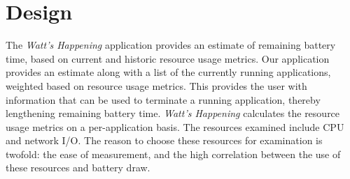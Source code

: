 \section{Design}
\label{sec:design}
% 


The \emph{Watt's Happening} application provides an estimate of remaining battery time, based on current and historic resource usage metrics. 
Our application provides an estimate along with a list of the currently running applications, weighted based on resource usage metrics.  
This provides the user with information that can be used to terminate a running application, thereby lengthening remaining battery time.
\emph{Watt's Happening} calculates the resource usage metrics on a per-application basis.
The resources examined include CPU and network I/O.
The reason to choose these resources for examination is twofold: the ease of measurement, and the high correlation between the use of these resources and battery draw.

